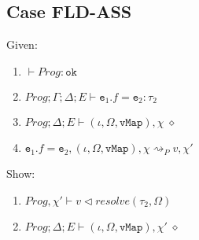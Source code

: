 \subsection{Case FLD-ASS}
Given:
\begin{enumerate}[label=\arabic*)]
    \item \label{proof:fldass-1} $\vdash Prog : \texttt{ok}$
    \item \label{proof:fldass-2} $Prog; \Gamma; \Delta; E \vdash \texttt{e}_1.f = \texttt{e}_2 : \tau_2$
    \item \label{proof:fldass-3} $Prog; \Delta; E \vdash (\iota, \Omega, \texttt{vMap}), \chi \; \diamond$
    \item \label{proof:fldass-4} $\texttt{e}_1.f = \texttt{e}_2, (\iota, \Omega, \texttt{vMap}), \chi \rightsquigarrow_P v, \chi' $
\end{enumerate}
Show:
\begin{enumerate}[label=\arabic*), resume]
    \item \label{proof:fldass-5} $Prog, \chi' \vdash v \triangleleft resolve(\tau_2, \Omega)$
    \item \label{proof:fldass-6} $Prog; \Delta; E \vdash (\iota, \Omega, \texttt{vMap}), \chi' \; \diamond$
\end{enumerate}
